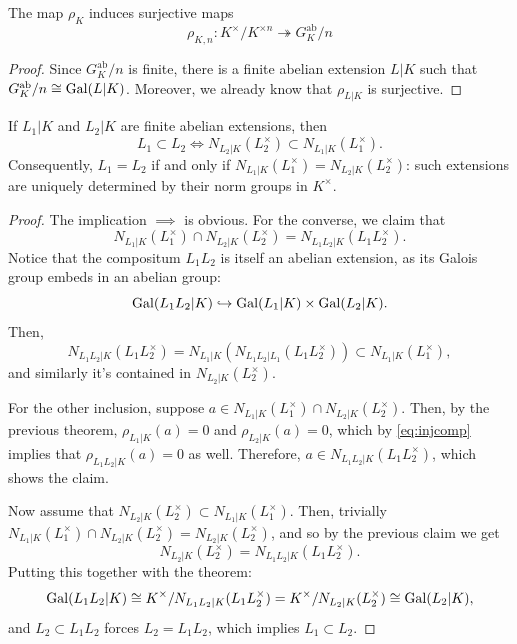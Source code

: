 \documentclass{article}
\begin{document}
\begin{cor}
		The map $\rho_K$ induces surjective maps
		\[
			\rho_{K,n}: K^\times / K^{\times n} \twoheadrightarrow G_K^\text{ab}/n
		\]
\end{cor}
\begin{proof}
		Since $G_K^\text{ab}/n$ is finite, there is a finite abelian extension $L|K$ such that $G_K^\text{ab}/n\cong \operatorname{Gal}(L|K)$. Moreover, we already know that $\rho_{L|K}$ is surjective. 
\end{proof}
\begin{cor}
		If $L_1|K$ and $L_2|K$ are finite abelian extensions, then
		\[
			L_1\subset L_2 \iff N_{L_2|K}(L_2^\times)\subset N_{L_1|K}(L_1^\times).
		\]
		Consequently, $L_1=L_2$ if and only if $N_{L_1|K}(L_1^\times)=N_{L_2|K}(L_2^\times)$: such extensions are uniquely determined by their norm groups in $K^\times$.
\end{cor}
\begin{proof}
		The implication $\implies$ is obvious. For the converse, we claim that 
		\[
			N_{L_1|K}(L_1^\times)\cap N_{L_2|K}(L_2^\times) = N_{L_1L_2|K}(L_1L_2^\times).
		\]
		Notice that the compositum $L_1L_2$ is itself an abelian extension, as its Galois group embeds in an abelian group:
		\begin{equation}\label{eq:injcomp}
				\operatorname{Gal}(L_1L_2|K)\hookrightarrow \operatorname{Gal}(L_1|K)\times \operatorname{Gal}(L_2|K).
		\end{equation}
		Then, 
		\[
			N_{L_1L_2|K}(L_1L_2^\times) = N_{L_1|K}(N_{L_1L_2|L_1}(L_1L_2^\times)) \subset N_{L_1|K}(L_1^\times),
		\]
		and similarly it's contained in $N_{L_2|K}(L_2^\times)$. 

		For the other inclusion, suppose $a\in N_{L_1|K}(L_1^\times)\cap N_{L_2|K}(L_2^\times)$. Then, by the previous theorem, $\rho_{L_1|K}(a)=0$ and $\rho_{L_2|K}(a)=0$, which by \eqref{eq:injcomp} implies that $\rho_{L_1L_2|K}(a)=0$ as well. Therefore, $a\in N_{L_1L_2|K}(L_1L_2^\times)$, which shows the claim.

		Now assume that $N_{L_2|K}(L_2^\times)\subset N_{L_1|K}(L_1^\times)$. Then, trivially $N_{L_1|K}(L_1^\times)\cap N_{L_2|K}(L_2^\times) = N_{L_2|K}(L_2^\times)$, and so by the previous claim we get
		\[
			N_{L_2|K}(L_2^\times) = N_{L_1L_2|K}(L_1L_2^\times).
		\]
		Putting this together with the theorem:
		\[
			\operatorname{Gal}(L_1L_2|K) \cong K^\times / N_{L_1L_2|K}(L_1L_2^\times) = K^\times / N_{L_2|K}(L_2^\times) \cong \operatorname{Gal}(L_2|K),
		\]
		and $L_2\subset L_1L_2$ forces $L_2=L_1L_2$, which implies $L_1\subset L_2$.

\end{proof}
\end{document}
